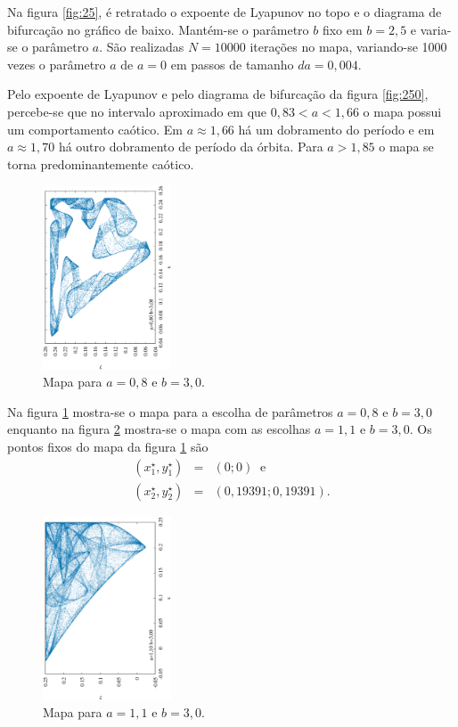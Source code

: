 \documentclass[brazilian, 12pt, a4paper, final]{article}
\begin{document}
\begin{multicols*}{2}
Na figura \ref{fig:25}, é retratado o expoente de Lyapunov  no topo e o  diagrama de bifurcação no gráfico de baixo. Mantém-se o parâmetro $b$ fixo em $b=2,5$ e varia-se o parâmetro $a$. São realizadas $N=10000$ iterações no mapa, variando-se 1000 vezes o parâmetro $a$ de $a=0$ em passos de tamanho $da=0,004$.

Pelo expoente de Lyapunov e pelo diagrama de bifurcação da figura \ref{fig:250}, percebe-se que no intervalo aproximado em que $0,83<a<1,66$ o mapa possui um comportamento caótico. Em $a\approx1,66$ há um dobramento do período e em $a\approx1,70$ há outro dobramento de período da órbita. Para $a>1,85$ o mapa se torna predominantemente caótico.

\begin{figure}[H] 
  \centering
  \includegraphics[width=0.34\textwidth,angle=-90]{mapa_a080_b300.eps}
  \caption{Mapa para $a=0,8$ e $b=3,0$.}
  \label{fig:080}
\end{figure}

Na figura \ref{fig:080} mostra-se o mapa para a escolha de parâmetros $a=0,8$ e $b=3,0$ enquanto na figura \ref{fig:110} mostra-se o mapa com as escolhas $a=1,1$ e $b=3,0$. 
Os pontos fixos do mapa da figura \ref{fig:080} são
\begin{eqnarray}
	\nonumber (x^{\star}_1,y^{\star}_1)&=&(0; 0) \;\; \mathrm{e} \\
	\nonumber (x^{\star}_2,y^{\star}_2)&=&(0,19391; 0,19391).
\end{eqnarray}

\begin{figure}[H] 
  \centering
  \includegraphics[width=0.34\textwidth,angle=-90]{mapa_a110_b300.eps}
  \caption{Mapa para $a=1,1$ e $b=3,0$.}
  \label{fig:110}
\end{figure}



\end{multicols*}
\end{document}
